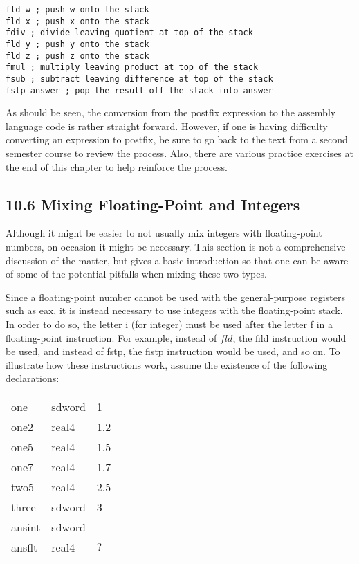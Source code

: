 \documentclass[10pt]{article}
\begin{document}
\begin{verbatim}
fld w ; push w onto the stack
fld x ; push x onto the stack
fdiv ; divide leaving quotient at top of the stack
fld y ; push y onto the stack
fld z ; push z onto the stack
fmul ; multiply leaving product at top of the stack
fsub ; subtract leaving difference at top of the stack
fstp answer ; pop the result off the stack into answer
\end{verbatim}

As should be seen, the conversion from the postfix expression to the assembly language code is rather straight forward. However, if one is having difficulty converting an expression to postfix, be sure to go back to the text from a second semester course to review the process. Also, there are various practice exercises at the end of this chapter to help reinforce the process.

\subsection*{10.6 Mixing Floating-Point and Integers}
Although it might be easier to not usually mix integers with floating-point numbers, on occasion it might be necessary. This section is not a comprehensive discussion of the matter, but gives a basic introduction so that one can be aware of some of the potential pitfalls when mixing these two types.

Since a floating-point number cannot be used with the general-purpose registers such as eax, it is instead necessary to use integers with the floating-point stack. In order to do so, the letter i (for integer) must be used after the letter f in a floating-point instruction. For example, instead of $f l d$, the fild instruction would be used, and instead of fstp, the fistp instruction would be used, and so on. To illustrate how these instructions work, assume the existence of the following declarations:

\begin{center}
\begin{tabular}{lll}
one & sdword & 1 \\
one2 & real4 & 1.2 \\
one5 & real4 & 1.5 \\
one7 & real4 & 1.7 \\
two5 & real4 & 2.5 \\
three & sdword & 3 \\
ansint & sdword &  \\
ansflt & real4 & $?$ \\
\end{tabular}
\end{center}
\end{document}
